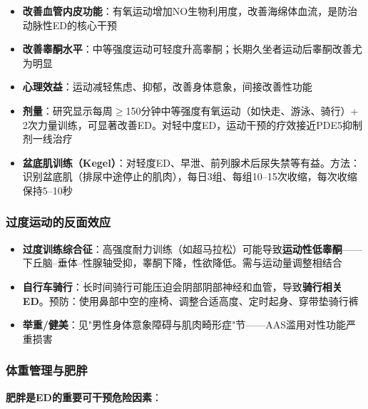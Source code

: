 \begin{itemize}[leftmargin=2cm]
	\item \textbf{改善血管内皮功能}：有氧运动增加NO生物利用度，改善海绵体血流，是防治动脉性ED的核心干预
	\item \textbf{改善睾酮水平}：中等强度运动可轻度升高睾酮；长期久坐者运动后睾酮改善尤为明显
	\item \textbf{心理效益}：运动减轻焦虑、抑郁，改善身体意象，间接改善性功能
	\item \textbf{剂量}：研究显示每周$\ge$150分钟中等强度有氧运动（如快走、游泳、骑行）+ 2次力量训练，可显著改善ED。对轻中度ED，运动干预的疗效接近PDE5抑制剂一线治疗
	\item \textbf{盆底肌训练（Kegel）}：对轻度ED、早泄、前列腺术后尿失禁等有益。方法：识别盆底肌（排尿中途停止的肌肉），每日3组、每组10--15次收缩，每次收缩保持5--10秒
\end{itemize}

\subsubsection{过度运动的反面效应}

\begin{itemize}[leftmargin=2cm]
	\item \textbf{过度训练综合征}：高强度耐力训练（如超马拉松）可能导致\textbf{运动性低睾酮}——下丘脑--垂体--性腺轴受抑，睾酮下降，性欲降低。需与运动量调整相结合
	\item \textbf{自行车骑行}：长时间骑行可能压迫会阴部阴部神经和血管，导致\textbf{骑行相关ED}。预防：使用鼻部中空的座椅、调整合适高度、定时起身、穿带垫骑行裤
	\item \textbf{举重/健美}：见"男性身体意象障碍与肌肉畸形症"节——AAS滥用对性功能严重损害
\end{itemize}

\subsubsection{体重管理与肥胖}

\textbf{肥胖是ED的重要可干预危险因素}：

